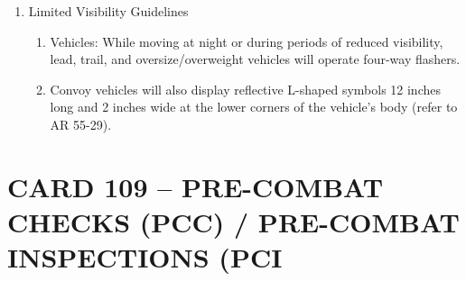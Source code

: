 \documentclass{article}
\begin{document}
\begin{enumerate}
\begin{enumerate}
\begin{enumerate}
\end{enumerate}
\end{enumerate}
\item	Limited Visibility Guidelines
\begin{enumerate}
    \item Vehicles: While moving at night or during periods of reduced visibility, lead, trail, and oversize/overweight vehicles will operate four-way flashers. 
    \item Convoy vehicles will also display reflective L-shaped symbols 12 inches long and 2 inches wide at the lower corners of the vehicle's body (refer to AR 55-29). 
\end{enumerate}
\end{enumerate}

\newpage
\section*{CARD 109 – PRE-COMBAT CHECKS (PCC) / PRE-COMBAT INSPECTIONS (PCI}
\end{document}
